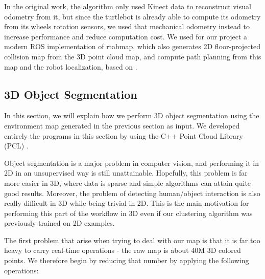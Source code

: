 In the original work, the algorithm only used Kinect data to reconstruct visual odometry from it, but since the turtlebot is already able to compute its odometry from its wheels rotation sensors, we used that mechanical odometry instead to increase performance and reduce computation cost. We used for our project a modern ROS implementation of rtabmap, which also generates 2D floor-projected collision map from the 3D point cloud map, and compute path planning from this map and the robot localization, based on \cite{rgbd-slam}\cite{loop-closure}.

\subsection{3D Object Segmentation}
\label{section:object_seg}
In this section, we will explain how we perform 3D object segmentation using the environment map generated in the previous section as input. We developed entirely the programs in this section by using the C++ Point Cloud Library (PCL) \cite{PCL}.

Object segmentation is a major problem in computer vision, and performing it in 2D in an unsupervised way is still unattainable. Hopefully, this problem is far more easier in 3D, where data is sparse and simple algorithms can attain quite good results. Moreover, the problem of detecting human/object interaction is also really difficult in 3D while being trivial in 2D. This is the main motivation for performing this part of the workflow in 3D even if our clustering algorithm was previously trained on 2D examples.

The first problem that arise when trying to deal with our map is that it is far too heavy to carry real-time operations - the raw map is about 40M 3D colored points. We therefore begin by reducing that number by applying the following operations: 

